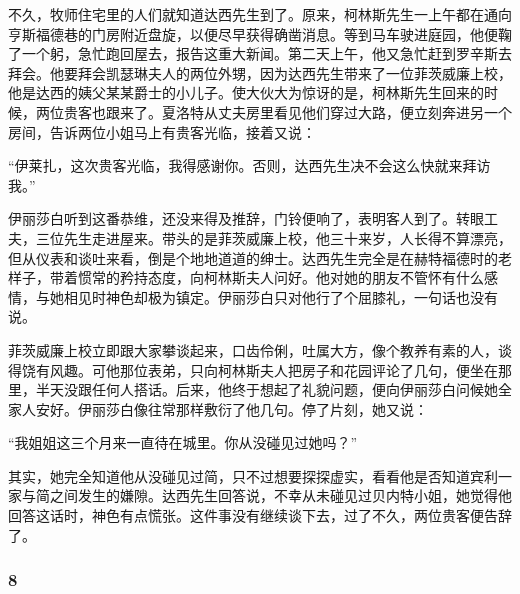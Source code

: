 \par 不久，牧师住宅里的人们就知道达西先生到了。原来，柯林斯先生一上午都在通向亨斯福德巷的门房附近盘旋，以便尽早获得确凿消息。等到马车驶进庭园，他便鞠了一个躬，急忙跑回屋去，报告这重大新闻。第二天上午，他又急忙赶到罗辛斯去拜会。他要拜会凯瑟琳夫人的两位外甥，因为达西先生带来了一位菲茨威廉上校，他是达西的姨父某某爵士的小儿子。使大伙大为惊讶的是，柯林斯先生回来的时候，两位贵客也跟来了。夏洛特从丈夫房里看见他们穿过大路，便立刻奔进另一个房间，告诉两位小姐马上有贵客光临，接着又说：
\par “伊莱扎，这次贵客光临，我得感谢你。否则，达西先生决不会这么快就来拜访我。”
\par 伊丽莎白听到这番恭维，还没来得及推辞，门铃便响了，表明客人到了。转眼工夫，三位先生走进屋来。带头的是菲茨威廉上校，他三十来岁，人长得不算漂亮，但从仪表和谈吐来看，倒是个地地道道的绅士。达西先生完全是在赫特福德时的老样子，带着惯常的矜持态度，向柯林斯夫人问好。他对她的朋友不管怀有什么感情，与她相见时神色却极为镇定。伊丽莎白只对他行了个屈膝礼，一句话也没有说。
\par 菲茨威廉上校立即跟大家攀谈起来，口齿伶俐，吐属大方，像个教养有素的人，谈得饶有风趣。可他那位表弟，只向柯林斯夫人把房子和花园评论了几句，便坐在那里，半天没跟任何人搭话。后来，他终于想起了礼貌问题，便向伊丽莎白问候她全家人安好。伊丽莎白像往常那样敷衍了他几句。停了片刻，她又说：
\par “我姐姐这三个月来一直待在城里。你从没碰见过她吗？”
\par 其实，她完全知道他从没碰见过简，只不过想要探探虚实，看看他是否知道宾利一家与简之间发生的嫌隙。达西先生回答说，不幸从未碰见过贝内特小姐，她觉得他回答这话时，神色有点慌张。这件事没有继续谈下去，过了不久，两位贵客便告辞了。



\subsubsection*{8}


